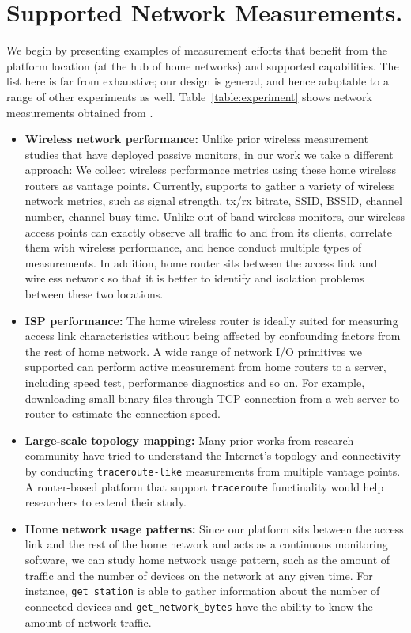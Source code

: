 {\section{Supported Network Measurements.}
\label{sec.network_measurement}
We begin by presenting examples of measurement efforts that benefit from the platform location (at the hub of home networks) and supported capabilities. The list here is far from exhaustive; our design is general, and hence adaptable to a range of other experiments as well. Table~\ref{table:experiment} shows network measurements obtained from \sysname.

\begin{itemize}
\item \textbf{Wireless network performance:} Unlike prior wireless measurement studies that have deployed passive monitors\cite{mahajan2006analyzing}\cite{raghavendra2009wi}\cite{papagiannaki2006experimental}, in our work we take a different approach: We collect wireless performance metrics using these home wireless routers as vantage points. Currently, \sysname supports to gather a variety of wireless network metrics, such as signal strength, tx/rx bitrate, SSID, BSSID, channel number, channel busy time.  Unlike out-of-band wireless monitors, our wireless access points can exactly observe all traffic to and from its clients, correlate them with wireless performance, and hence conduct multiple types of measurements. In addition, home router sits between the access link and wireless network so that it is better to identify and isolation problems between these two locations.

\item \textbf{ISP performance:} The home wireless router is ideally suited for measuring access link characteristics without being affected by confounding factors from the rest of home network. A wide range of network I/O primitives we supported can perform active measurement from home routers to a server, including speed test, performance diagnostics and so on. For example, downloading small binary files through TCP connection from a web server to router to estimate the connection speed.

\item \textbf{Large-scale topology mapping:} Many prior works from research community have tried to understand the Internet's topology and connectivity by conducting \texttt{traceroute-like} measurements from multiple vantage points.\cite{paxson1996end}\cite{chen2009sidewalk} A router-based platform that support \texttt{traceroute} functinality would help researchers to extend their study.

\item \textbf{Home network usage patterns:} Since our platform sits between the access link and the rest of the home network and acts as a continuous monitoring software, we can study home network usage pattern, such as the amount of traffic and the number of devices on the network at any given time. For instance, \texttt{get\_station} is able to gather information about the number of connected devices and \texttt{get\_network\_bytes} have the ability to know the amount of network traffic.    
\end{itemize} 
\par}
